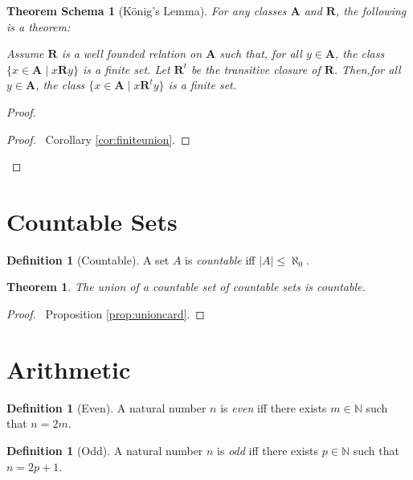 \documentclass{book}
\let\qed\relax
\newtheorem{thm}[ax]{Theorem}
\newtheorem{thms}[ax]{Theorem Schema}
\theoremstyle{definition}
\newtheorem{df}[ax]{Definition}
\begin{document}
\begin{thms}[K\"{o}nig's Lemma]
For any classes $\mathbf{A}$ and $\mathbf{R}$, the following is a theorem:

Assume $\mathbf{R}$ is a well founded relation on $\mathbf{A}$ such that, for all $y \in \mathbf{A}$, the class $\{ x \in \mathbf{A} \mid x \mathbf{R} y \}$ is a finite set. Let $\mathbf{R}^t$ be the transitive closure of $\mathbf{R}$. Then,for all $y \in \mathbf{A}$, the class $\{ x \in \mathbf{A} \mid x \mathbf{R}^t y \}$ is a finite set.
\end{thms}

\begin{proof}
\pf
{}
\begin{proof}
	\pf\ Corollary \ref{cor:finiteunion}.
\end{proof}
\qed
\end{proof}

\section{Countable Sets}

\begin{df}[Countable]
A set $A$ is \emph{countable} iff $|A| \leq \aleph_0$.
\end{df}

\begin{thm}
The union of a countable set of countable sets is countable.
\end{thm}

\begin{proof}
\pf\ Proposition \ref{prop:unioncard}. \qed
\end{proof}

\section{Arithmetic}

\begin{df}[Even]
A natural number $n$ is \emph{even} iff there exists $m \in \mathbb{N}$ such that $n = 2m$.
\end{df}

\begin{df}[Odd]
A natural number $n$ is \emph{odd} iff there exists $p \in \mathbb{N}$ such that $n = 2p+1$.
\end{df}
\end{document}

